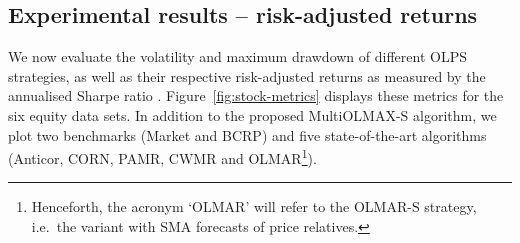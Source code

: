 \begin{table}[H]
  \caption{Statistical tests of the performance achieved by the MultiOLMAX-S algorithm on the stock data sets. The acronym MER stands for `mean excess return'.}
  \label{tab:stat-tests}
  \centering
\end{table}

\subsection{Experimental results -- risk-adjusted returns}

We now evaluate the volatility and maximum drawdown of different OLPS strategies, as well as their respective risk-adjusted returns as measured by the annualised Sharpe ratio \citep{sharpe}. Figure~\ref{fig:stock-metrics} displays these metrics for the six equity data sets. In addition to the proposed MultiOLMAX-S algorithm, we plot two benchmarks (Market and BCRP) and five state-of-the-art algorithms (Anticor, CORN, PAMR, CWMR and OLMAR\footnote{Henceforth, the acronym `OLMAR' will refer to the OLMAR-S strategy, i.e.\ the variant with SMA forecasts of price relatives.}).

